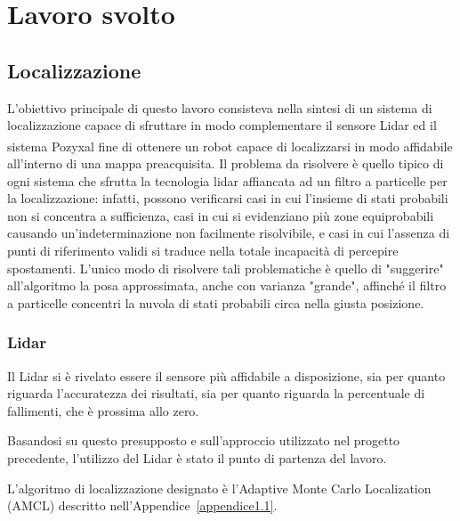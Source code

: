 
\chapter{Lavoro svolto}

\section{Localizzazione}
\label{localizzazione}
L'obiettivo principale di questo lavoro consisteva nella sintesi di un sistema di localizzazione capace di sfruttare in modo complementare il sensore Lidar ed il sistema Pozyx\textsuperscript\textregistered\hspace{1mm}al fine di ottenere un robot capace di localizzarsi in modo affidabile all'interno di una mappa preacquisita. Il problema da risolvere è quello tipico di ogni sistema che sfrutta la tecnologia lidar affiancata ad un filtro a particelle per la localizzazione: infatti, possono verificarsi casi in cui l'insieme di stati probabili non si concentra a sufficienza, casi in cui si evidenziano più zone equiprobabili causando un'indeterminazione non facilmente risolvibile, e casi in cui l'assenza di punti di riferimento validi si traduce nella totale incapacità di percepire spostamenti. L'unico modo di risolvere tali problematiche è quello di "suggerire" all'algoritmo la posa approssimata, anche con varianza "grande", affinché il filtro a particelle concentri la nuvola di stati probabili circa nella giusta posizione.

\subsection{Lidar}
\label{lidar}

Il Lidar si è rivelato essere il sensore più affidabile a disposizione, sia per quanto riguarda l’accuratezza dei risultati, sia per quanto riguarda la percentuale di fallimenti, che è prossima allo zero.

Basandosi su questo presupposto e sull’approccio utilizzato nel progetto precedente, l’utilizzo del Lidar è stato il punto di partenza del lavoro.

L’algoritmo di localizzazione designato è l’Adaptive Monte Carlo Localization (AMCL) descritto nell'Appendice~\ref{appendice1.1}.

